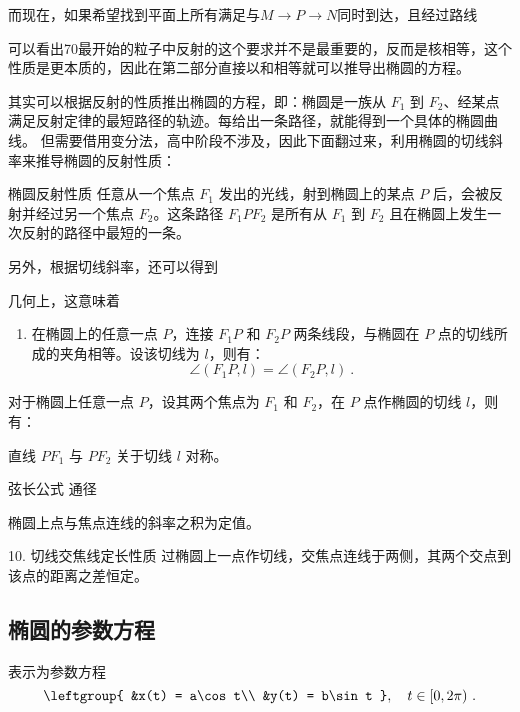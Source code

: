 而现在，如果希望找到平面上所有满足与$M\to P\to N$同时到达，且经过路线

可以看出70最开始的粒子中反射的这个要求并不是最重要的，反而是核相等，这个性质是更本质的，因此在第二部分直接以和相等就可以推导出椭圆的方程。



其实可以根据反射的性质推出椭圆的方程，即：椭圆是一族从 $F_1$ 到 $F_2$、经某点满足反射定律的最短路径的轨迹。每给出一条路径，就能得到一个具体的椭圆曲线。
但需要借用变分法，高中阶段不涉及，因此下面翻过来，利用椭圆的切线斜率来推导椭圆的反射性质：

\begin{theorem}{椭圆反射性质}
任意从一个焦点 $F_1$ 发出的光线，射到椭圆上的某点 $P$ 后，会被反射并经过另一个焦点 $F_2$。这条路径 $F_1PF_2$ 是所有从 $F_1$ 到 $F_2$ 且在椭圆上发生一次反射的路径中最短的一条。
\end{theorem}

另外，根据切线斜率，还可以得到


几何上，这意味着
\begin{enumerate}
\item 在椭圆上的任意一点 $P$，连接 $F_1P$ 和 $F_2P$ 两条线段，与椭圆在 $P$ 点的切线所成的夹角相等。设该切线为 $l$，则有：
\begin{equation}
\angle (F_1P, l) = \angle (F_2P, l)~.
\end{equation}

\end{enumerate}


对于椭圆上任意一点 $P$，设其两个焦点为 $F_1$ 和 $F_2$，在 $P$ 点作椭圆的切线 $l$，则有：

	直线 $PF_1$ 与 $PF_2$ 关于切线 $l$ 对称。


弦长公式
通径

椭圆上点与焦点连线的斜率之积为定值。


	10.	切线交焦线定长性质
过椭圆上一点作切线，交焦点连线于两侧，其两个交点到该点的距离之差恒定。


\subsection{椭圆的参数方程}
表示为参数方程
\begin{equation}\label{eq_Elips3_1}
\leftgroup{
&x(t) = a\cos t\\
&y(t) = b\sin t
},\quad t \in [0, 2\pi) ~.
\end{equation}


